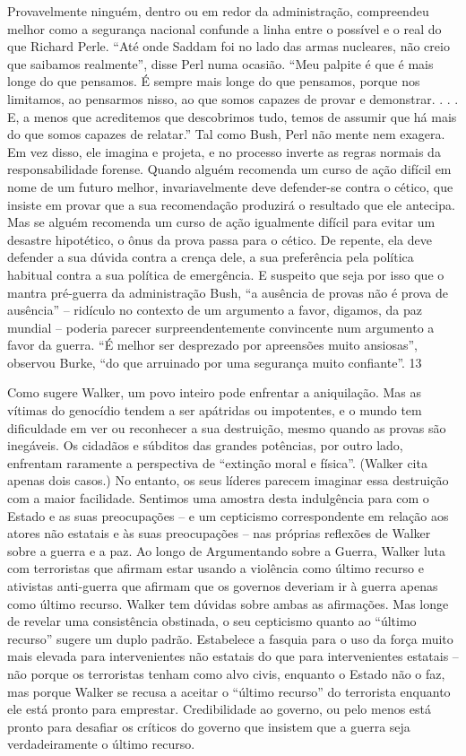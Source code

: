 Provavelmente ninguém, dentro ou em redor da administração, compreendeu melhor como a segurança nacional confunde a linha entre o possível e o real do que Richard Perle. “Até onde Saddam foi no lado das armas nucleares, não creio que saibamos realmente”, disse Perl numa ocasião. “Meu palpite é que é mais longe do que pensamos. É sempre mais longe do que pensamos, porque nos limitamos, ao pensarmos nisso, ao que somos capazes de provar e demonstrar. . . . E, a menos que acreditemos que descobrimos tudo, temos de assumir que há mais do que somos capazes de relatar.” Tal como Bush, Perl não mente nem exagera. Em vez disso, ele imagina e projeta, e no processo inverte as regras normais da responsabilidade forense. Quando alguém recomenda um curso de ação difícil em nome de um futuro melhor, invariavelmente deve defender-se contra o cético, que insiste em provar que a sua recomendação produzirá o resultado que ele antecipa. Mas se alguém recomenda um curso de ação igualmente difícil para evitar um desastre hipotético, o ônus da prova passa para o cético. De repente, ela deve defender a sua dúvida contra a crença dele, a sua preferência pela política habitual contra a sua política de emergência. E suspeito que seja por isso que o mantra pré-guerra da administração Bush, “a ausência de provas não é prova de ausência” – ridículo no contexto de um argumento a favor, digamos, da paz mundial – poderia parecer surpreendentemente convincente num argumento a favor da guerra. “É melhor ser desprezado por apreensões muito ansiosas”, observou Burke, “do que arruinado por uma segurança muito confiante”.
 {\color{blue} 13}  

 
\par
 
Como sugere Walker, um povo inteiro pode enfrentar a aniquilação. Mas as vítimas do genocídio tendem a ser apátridas ou impotentes, e o mundo tem dificuldade em ver ou reconhecer a sua destruição, mesmo quando as provas são inegáveis. Os cidadãos e súbditos das grandes potências, por outro lado, enfrentam raramente a perspectiva de “extinção moral e física”. (Walker cita apenas dois casos.) No entanto, os seus líderes parecem imaginar essa destruição com a maior facilidade. Sentimos uma amostra desta indulgência para com o Estado e as suas preocupações – e um cepticismo correspondente em relação aos atores não estatais e às suas preocupações – nas próprias reflexões de Walker sobre a guerra e a paz. Ao longo de Argumentando sobre a Guerra, Walker luta com terroristas que afirmam estar usando a violência como último recurso e ativistas anti-guerra que afirmam que os governos deveriam ir à guerra apenas como último recurso. Walker tem dúvidas sobre ambas as afirmações. Mas longe de revelar uma consistência obstinada, o seu cepticismo quanto ao “último recurso” sugere um duplo padrão. Estabelece a fasquia para o uso da força muito mais elevada para intervenientes não estatais do que para intervenientes estatais – não porque os terroristas tenham como alvo civis, enquanto o Estado não o faz, mas porque Walker se recusa a aceitar o “último recurso” do terrorista enquanto ele está pronto para emprestar. Credibilidade ao governo, ou pelo menos está pronto para desafiar os críticos do governo que insistem que a guerra seja verdadeiramente o último recurso.
 
